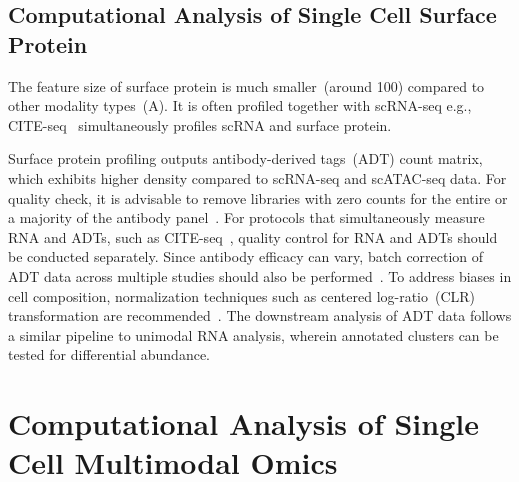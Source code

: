 \subsection{Computational Analysis of Single Cell Surface Protein}
\label{background:sec2:protein}
The feature size of surface protein is much smaller~(around 100) compared to other modality types~(A). It is often profiled together with scRNA-seq e.g., CITE-seq~\citep{citeseq2017} simultaneously profiles scRNA and surface protein.

Surface protein profiling outputs antibody-derived tags~(ADT) count matrix, which exhibits higher density compared to scRNA-seq and scATAC-seq data. For quality check, it is advisable to remove libraries with zero counts for the entire or a majority of the antibody panel~\citep{amezquita2020adtqc}. For protocols that simultaneously measure RNA and ADTs, such as CITE-seq~\citep{citeseq2017}, quality control for RNA and ADTs should be conducted separately. Since antibody efficacy can vary, batch correction of ADT data across multiple studies should also be performed~\citep{zheng2022adtqc}. To address biases in cell composition, normalization techniques such as centered log-ratio~(CLR) transformation are recommended~\citep{stoeckius2017citeseq}. The downstream analysis of ADT data follows a similar pipeline to unimodal RNA analysis, wherein annotated clusters can be tested for differential abundance.


\section{Computational Analysis of Single Cell Multimodal Omics}
\label{background:multimodal}


